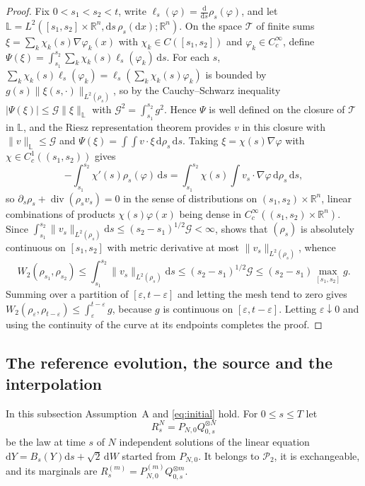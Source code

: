 \documentclass[11pt]{amsart}
\numberwithin{equation}{section}
\theoremstyle{plain}
\theoremstyle{remark}
\newcommand{\R}{\mathbb{R}}
\newcommand{\cP}{\mathcal{P}}
\newcommand{\cT}{\mathcal{T}}
\newcommand{\W}{W_2}
\newcommand{\dd}{\mathrm{d}}
\DeclareMathOperator{\dv}{div}
\begin{document}
\begin{proof}
Fix $0<s_1<s_2<t$, write $\ell_s(\varphi)=\frac{\dd}{\dd s}\rho_s(\varphi)$, and let $\mathbb L=L^2([s_1,s_2]\times\R^n,\dd s\,\rho_s(\dd x);\R^n)$. On the space $\cT$ of finite sums $\xi=\sum_k\chi_k(s)\nabla\varphi_k(x)$ with $\chi_k\in C([s_1,s_2])$ and $\varphi_k\in C^\infty_c$, define $\Psi(\xi)=\int_{s_1}^{s_2}\sum_k\chi_k(s)\ell_s(\varphi_k)\,\dd s$. For each $s$, $\sum_k\chi_k(s)\ell_s(\varphi_k)=\ell_s(\sum_k\chi_k(s)\varphi_k)$ is bounded by $g(s)\|\xi(s,\cdot)\|_{L^2(\rho_s)}$, so by the Cauchy--Schwarz inequality $|\Psi(\xi)|\le \mathcal G\|\xi\|_{\mathbb L}$ with $\mathcal G^2=\int_{s_1}^{s_2}g^2$. Hence $\Psi$ is well defined on the closure of $\cT$ in $\mathbb L$, and the Riesz representation theorem provides $v$ in this closure with $\|v\|_{\mathbb L}\le \mathcal G$ and $\Psi(\xi)=\int\!\!\int v\cdot\xi\,\dd\rho_s\,\dd s$. Taking $\xi=\chi(s)\nabla\varphi$ with $\chi\in C^1_c((s_1,s_2))$ gives
\[
-\int_{s_1}^{s_2}\chi'(s)\rho_s(\varphi)\,\dd s=\int_{s_1}^{s_2}\chi(s)\int v_s\cdot\nabla\varphi\,\dd\rho_s\,\dd s,
\]
so $\partial_s\rho_s+\dv(\rho_sv_s)=0$ in the sense of distributions on $(s_1,s_2)\times\R^n$, linear combinations of products $\chi(s)\varphi(x)$ being dense in $C^\infty_c((s_1,s_2)\times\R^n)$. Since $\int_{s_1}^{s_2}\|v_s\|_{L^2(\rho_s)}\dd s\le(s_2-s_1)^{1/2}\mathcal G<\infty$, \cite[Theorem~8.3.1]{AGS08} shows that $(\rho_s)$ is absolutely continuous on $[s_1,s_2]$ with metric derivative at most $\|v_s\|_{L^2(\rho_s)}$, whence
\[
\W(\rho_{s_1},\rho_{s_2})\le\int_{s_1}^{s_2}\|v_s\|_{L^2(\rho_s)}\dd s\le(s_2-s_1)^{1/2}\mathcal G\le(s_2-s_1)\max_{[s_1,s_2]}g.
\]
Summing over a partition of $[\varepsilon,t-\varepsilon]$ and letting the mesh tend to zero gives $\W(\rho_\varepsilon,\rho_{t-\varepsilon})\le\int_\varepsilon^{t-\varepsilon}g$, because $g$ is continuous on $[\varepsilon,t-\varepsilon]$. Letting $\varepsilon\downarrow0$ and using the continuity of the curve at its endpoints completes the proof.
\end{proof}

\subsection{The reference evolution, the source and the interpolation}\label{sec:objects}
In this subsection Assumption~A and \eqref{eq:initial} hold. For $0\le s\le T$ let
\[
R^N_s=P_{N,0}Q_{0,s}^{\otimes N}
\]
be the law at time $s$ of $N$ independent solutions of the linear equation $\dd Y=B_s(Y)\dd s+\sqrt2\,\dd W$ started from $P_{N,0}$. It belongs to $\cP_2$, it is exchangeable, and its marginals are $R^{(m)}_s=P^{(m)}_{N,0}Q_{0,s}^{\otimes m}$.
\end{document}
